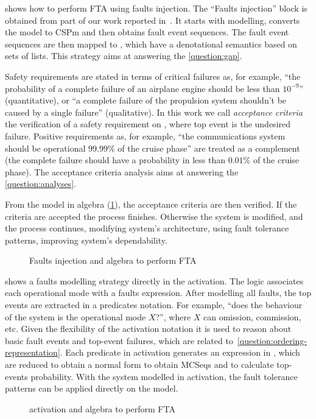  shows how to perform \ac{FTA} using faults injection.
The ``Faults injection'' block is obtained from part of our work reported in~\cite{DM2012,Didier2012}.
It starts with \simulink modelling, converts the model to \ac{CSPm} and then obtains fault event sequences.
The fault event sequences are then mapped to , which have a denotational semantics based on sets of lists.
This strategy aims at answering the \cref{question:gap}.

Safety requirements are stated in terms of critical failures as, for example, ``the probability of a complete failure of an airplane engine should be less than $10^{-9}$'' (quantitative), or ``a complete failure of the propulsion system shouldn't be caused by a single failure'' (qualitative).
In this work we call \emph{acceptance criteria} the verification of a safety requirement on , where  top event is the undesired failure.
Positive requirements as, for example, ``the communications system should be operational $99.99\%$ of the cruise phase'' are treated as a complement (the complete failure should have a probability in less than $0.01\%$ of the cruise phase).
The acceptance criteria analysis aims at answering the \ref{question:analyses}.

From the model in \ac{algebra} (\cref{fig:strategy-overview-csp}), the acceptance criteria are then verified.
If the criteria are accepted the process finishes.
Otherwise the system is modified, and the process continues, modifying system's architecture, using fault tolerance patterns, improving system's dependability.
%
\begin{figure}[htb]
  \centering
  \caption{Faults injection and \ac{algebra} to perform \ac{FTA}}
  \label{fig:strategy-overview-csp}
\end{figure}

 shows a faults modelling strategy directly in the \ac{activation}.
The logic associates each operational mode with a faults expression.
After modelling all faults, the top events are extracted in a predicates notation. 
For example, ``does the behaviour of the system is the operational mode $X$?'', where $X$ can omission, commission, etc.
Given the flexibility of the \ac{activation} notation it is used to reason about basic fault events and top-event failures, which are related to~\ref{question:ordering-representation}.
Each predicate in \ac{activation} generates an expression in , which are reduced to obtain a normal form to obtain \acp{MCSeq} and to calculate top-events probability.
With the system modelled in \ac{activation}, the fault tolerance patterns can be applied directly on the model.
%
\begin{figure}[htb]
  \centering
  \caption{\Ac{activation} and \ac{algebra} to perform \ac{FTA}}
  \label{fig:strategy-overview-activation}
\end{figure}

